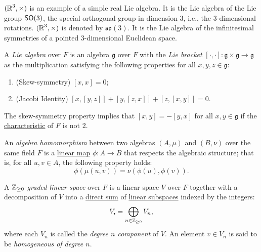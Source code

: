 \begin{remark}
	$(\operatorname{\mathbb{R}}^3, \times)$ is an example of a simple real Lie algebra. It is the Lie algebra of the Lie group $\operatorname{\text{\normalfont\sffamily SO}}(3)$, the special orthogonal group in dimension 3, i.e., the 3-dimensional rotations. $(\operatorname{\mathbb{R}}^3, \times)$ is denoted by $\mathfrak{so}(3)$. It is the Lie algebra of the infinitesimal symmetries of a pointed 3-dimensional Euclidean space.
\end{remark}

\begin{definition}\label{def:lie_algebra}
	A \emph{Lie algebra} over $F$ is an algebra $\mathfrak{g}$ over $F$ with the \emph{Lie bracket} $[\cdot, \cdot] \colon \mathfrak{g} \times \mathfrak{g} \to \mathfrak{g}$ as the multiplication satisfying the following properties for all $x, y, z \in \mathfrak{g}$:
	\begin{enumerate}
		\item (Skew-symmetry) $[x, x] = 0$;
		\item (Jacobi Identity) $[x, [y, z]] + [y, [z, x]] + [z, [x, y]] = 0$.
	\end{enumerate}
	The skew-symmetry property implies that $[x, y] = -[y, x]$ for all $x, y \in \mathfrak{g}$ if the \hyperref[def:characteristic_of_a_field]{characteristic} of $F$ is not 2.
\end{definition}

\begin{definition}\label{def:algebra_homomorphism}
	An \emph{algebra homomorphism} between two algebras $(A, \mu)$ and $(B, \nu)$ over the same field $F$ is a \hyperref[def:linear_map]{linear map} $\phi \colon A \to B$ that respects the algebraic structure; that is, for all $u, v \in A$, the following property holds:
	\[
		\phi(\mu(u, v)) = \nu(\phi(u), \phi(v)).
	\]
\end{definition}

\begin{definition}\label{def:graded_linear_space}
	A $\operatorname{\mathbb{Z}}_{\geq 0}$-\emph{graded linear space} over $F$ is a linear space $V$ over $F$ together with a decomposition of $V$ into a \hyperref[def:internal_direct_sum]{direct sum} of \hyperref[def:linear_subspace]{linear subspaces} indexed by the integers:
	\[
		V_{\smallbullet} = \bigoplus_{n \in \Z_{\geq 0}} V_n,
	\]
	where each $V_n$ is called the \emph{degree $n$ component} of $V$. An element $v \in V_n$ is said to be \emph{homogeneous of degree $n$}.
\end{definition}

